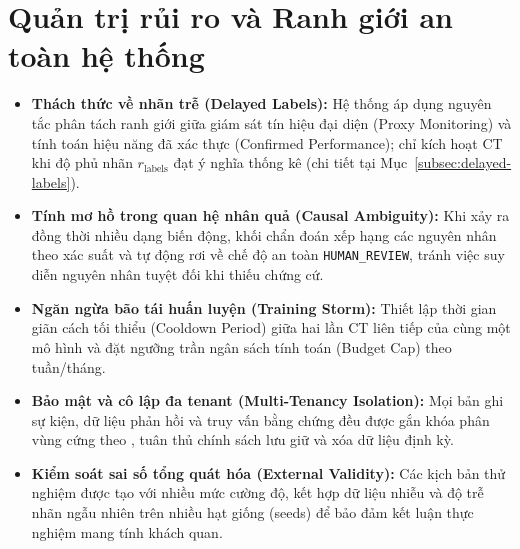 \section{Quản trị rủi ro và Ranh giới an toàn hệ thống}

\begin{itemize}
  \item \textbf{Thách thức về nhãn trễ (Delayed Labels):} Hệ thống áp dụng nguyên tắc phân tách ranh giới giữa giám sát tín hiệu đại diện (Proxy Monitoring) và tính toán hiệu năng đã xác thực (Confirmed Performance); chỉ kích hoạt CT khi độ phủ nhãn $r_\text{labels}$ đạt ý nghĩa thống kê (chi tiết tại Mục~\ref{subsec:delayed-labels}).
  \item \textbf{Tính mơ hồ trong quan hệ nhân quả (Causal Ambiguity):} Khi xảy ra đồng thời nhiều dạng biến động, khối chẩn đoán xếp hạng các nguyên nhân theo xác suất và tự động rơi về chế độ an toàn \texttt{HUMAN\_REVIEW}, tránh việc suy diễn nguyên nhân tuyệt đối khi thiếu chứng cứ.
  \item \textbf{Ngăn ngừa bão tái huấn luyện (Training Storm):} Thiết lập thời gian giãn cách tối thiểu (Cooldown Period) giữa hai lần CT liên tiếp của cùng một mô hình và đặt ngưỡng trần ngân sách tính toán (Budget Cap) theo tuần/tháng.
  \item \textbf{Bảo mật và cô lập đa tenant (Multi-Tenancy Isolation):} Mọi bản ghi sự kiện, dữ liệu phản hồi và truy vấn bằng chứng đều được gắn khóa phân vùng cứng theo , tuân thủ chính sách lưu giữ và xóa dữ liệu định kỳ.
  \item \textbf{Kiểm soát sai số tổng quát hóa (External Validity):} Các kịch bản thử nghiệm được tạo với nhiều mức cường độ, kết hợp dữ liệu nhiễu và độ trễ nhãn ngẫu nhiên trên nhiều hạt giống (seeds) để bảo đảm kết luận thực nghiệm mang tính khách quan.
\end{itemize}
